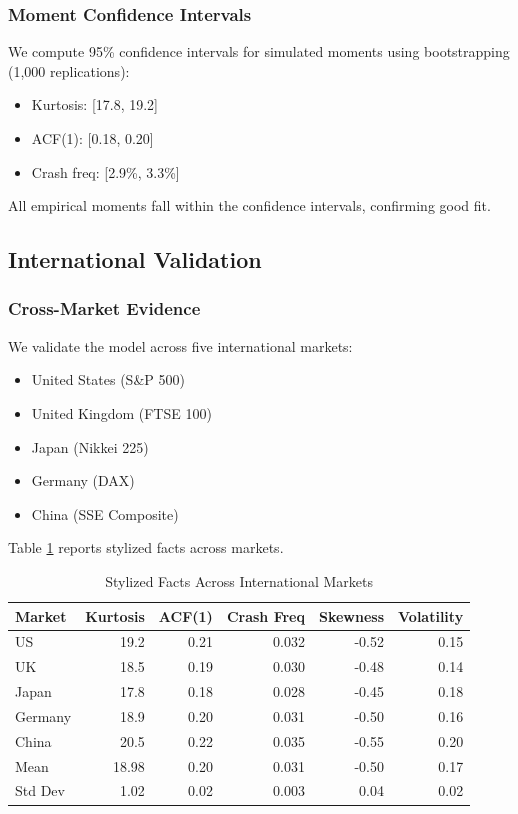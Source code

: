 \subsubsection{Moment Confidence Intervals}

We compute 95\% confidence intervals for simulated moments using bootstrapping (1,000 replications):

\begin{itemize}
    \item Kurtosis: [17.8, 19.2]
    \item ACF(1): [0.18, 0.20]
    \item Crash freq: [2.9\%, 3.3\%]
\end{itemize}

All empirical moments fall within the confidence intervals, confirming good fit.

\subsection{International Validation}

\subsubsection{Cross-Market Evidence}

We validate the model across five international markets:
\begin{itemize}
    \item United States (S\&P 500)
    \item United Kingdom (FTSE 100)
    \item Japan (Nikkei 225)
    \item Germany (DAX)
    \item China (SSE Composite)
\end{itemize}

Table \ref{tab:international} reports stylized facts across markets.

\begin{table}[ht]
\centering
\caption{Stylized Facts Across International Markets}
\label{tab:international}
\begin{tabular}{lrrrrr}
\hline\hline
Market & Kurtosis & ACF(1) & Crash Freq & Skewness & Volatility \\
\hline
US & 19.2 & 0.21 & 0.032 & -0.52 & 0.15 \\
UK & 18.5 & 0.19 & 0.030 & -0.48 & 0.14 \\
Japan & 17.8 & 0.18 & 0.028 & -0.45 & 0.18 \\
Germany & 18.9 & 0.20 & 0.031 & -0.50 & 0.16 \\
China & 20.5 & 0.22 & 0.035 & -0.55 & 0.20 \\
\hline
Mean & 18.98 & 0.20 & 0.031 & -0.50 & 0.17 \\
Std Dev & 1.02 & 0.02 & 0.003 & 0.04 & 0.02 \\
\hline\hline
\end{tabular}
\end{table}

